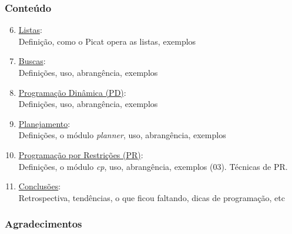 			
\begin{frame}[fragile]
  \frametitle{Conteúdo}
  
  \begin{enumerate}

   \setcounter{enumi}{5}
    \item  \underline{Listas}:\\
    Definição, como o Picat opera as listas, exemplos


    \pause
    \item  \underline{Buscas}:\\
    Definições, uso, abrangência, exemplos

    \pause
    \item \underline{ Programação Dinâmica (PD)}:\\
        Definições, uso, abrangência, exemplos

    
    \pause
    \item \underline{Planejamento}:\\
        Definições, o módulo \textit{planner}, uso, abrangência, exemplos

    \pause
		\item  \underline{Programação por Restrições (PR)}:\\
      Definições, o módulo \textit{cp}, uso, abrangência, exemplos (03).
      Técnicas de PR.

    \pause
		\item  \underline{Conclusões}:\\
    Retrospectiva, tendências, o que ficou faltando, dicas de programação, etc
    
\end{enumerate}

\end{frame}



\begin{frame}[fragile]
  \frametitle{Agradecimentos}


						



\end{frame}

